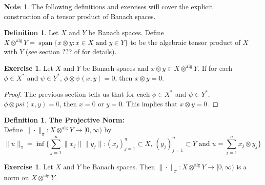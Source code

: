 \documentclass[12pt]{amsart}
\theoremstyle{definition}
\newtheorem{defn}[definition]{Definition}
\newtheorem{note}[definition]{Note}
\newtheorem{ex}[definition]{Exercise}
\newcommand{\Rg}{[0,\infty)}
\DeclareMathOperator{\spn}{span}
\begin{document}
	
	\begin{note}
	The following definitions and exercises will cover the explicit construction of a tensor product of Banach spaces.
	\end{note}	
	
	\begin{defn}
	Let $X$ and $Y$ be Banach spaces. Define $X \otimes^{\text{alg}} Y = \spn \{ x \otimes y: x \in X \text{ and } y \in Y \}$ to be the algebraic tensor product of $X$ with $Y$ (see section ??? of \cite{algebra} for details). 
	\end{defn}
	
	\begin{ex}
	Let $X$ and $Y$ be Banach spaces and $x \otimes y \in X \otimes^{\text{alg}} Y$. If for each $\phi \in X^*$ and $\psi \in Y^*$, $\phi \otimes \psi(x,y) = 0$, then $x \otimes y = 0$.
	\end{ex}
	
	\begin{proof}
	The previous section tells us that for each $\phi \in X^*$ and $\psi \in Y^*$, $\phi \otimes psi(x,y) = 0$, then $x = 0$ or $y = 0$. This implies that $x \otimes y = 0$.
	\end{proof}
	
	\begin{defn}\textbf{The Projective Norm:} \\
	Define $\|\cdot \|_{\pi}:X \otimes^{\text{alg}} Y \rightarrow \Rg$ by $$\|u\|_{\pi} = \inf \bigg \{ \sum_{j=1}^n \|x_j\| \|y_j\|: (x_j)_{j=1}^n \subset X \text{, }  (y_j)_{j=1}^n \subset Y \text{ and } u = \sum_{j=1}^n x_j \otimes y_j  \bigg \}$$
	\end{defn}
	
	\begin{ex}
	Let $X$ and $Y$ be Banach spaces. Then $\| \cdot \|_{\pi}: X \otimes^{\text{alg}} Y \rightarrow \Rg$ is a norm on $X \otimes^{\text{alg}} Y$.
	\end{ex}
	
\end{document}
